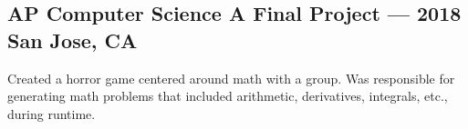 \documentclass[../Resume.tex]{subfiles}
\begin{document}
	\subsection{AP Computer Science A Final Project --- 2018 \null\hfill San Jose, CA}
	\par Created a horror game centered around math with a group. Was responsible for generating math problems that included arithmetic, derivatives, integrals, etc., during runtime.
	\vspace*{-2mm}
\end{document}
